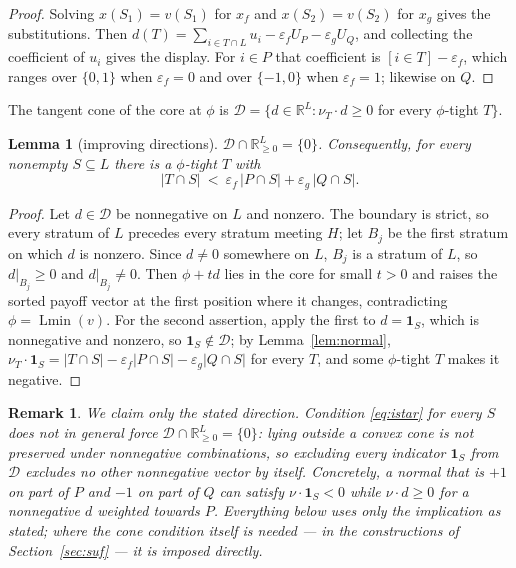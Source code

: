\documentclass[11pt]{article}
\newtheorem{lemma}[theorem]{Lemma}
\newtheorem{remark}[theorem]{Remark}
\newcommand{\Lmin}{\operatorname{Lmin}}
\newcommand{\one}{\mathbf 1}
\begin{document}
\begin{proof}
Solving $x(S_1)=v(S_1)$ for $x_f$ and $x(S_2)=v(S_2)$ for $x_g$ gives the
substitutions.  Then
$d(T)=\sum_{i\in T\cap L}u_i-\varepsilon_fU_P-\varepsilon_gU_Q$, and
collecting the coefficient of $u_i$ gives the display.  For $i\in P$ that
coefficient is $[i\in T]-\varepsilon_f$, which ranges over $\{0,1\}$ when
$\varepsilon_f=0$ and over $\{-1,0\}$ when $\varepsilon_f=1$; likewise on $Q$.
\end{proof}

The tangent cone of the core at $\phi$ is
$\mathcal D=\{d\in\mathbb R^L:\nu_T\cdot d\ge0$ for every $\phi$-tight $T\}$.

\begin{lemma}[improving directions]\label{lem:improve}
$\mathcal D\cap\mathbb R^L_{\ge0}=\{0\}$.  Consequently, for every nonempty
$S\subseteq L$ there is a $\phi$-tight $T$ with
\begin{equation}\label{eq:istar}
 |T\cap S|\ <\ \varepsilon_f\,|P\cap S|+\varepsilon_g\,|Q\cap S| .
\end{equation}
\end{lemma}

\begin{proof}
Let $d\in\mathcal D$ be nonnegative on $L$ and nonzero.  The boundary is
strict, so every stratum of $L$ precedes every stratum meeting $H$; let $B_j$
be the first stratum on which $d$ is nonzero.  Since $d\ne0$ somewhere on $L$,
$B_j$ is a stratum of $L$, so $d|_{B_j}\ge0$ and $d|_{B_j}\ne0$.  Then
$\phi+td$ lies in the core for small $t>0$ and raises the sorted payoff vector
at the first position where it changes, contradicting $\phi=\Lmin(v)$.  For the
second assertion, apply the first to $d=\one_S$, which is nonnegative and
nonzero, so $\one_S\notin\mathcal D$; by Lemma~\ref{lem:normal},
$\nu_T\cdot\one_S=|T\cap S|-\varepsilon_f|P\cap S|-\varepsilon_g|Q\cap S|$ for
every $T$, and some $\phi$-tight $T$ makes it negative.
\end{proof}

\begin{remark}\label{rem:noconverse}
We claim only the stated direction.  Condition \eqref{eq:istar} for every $S$
does \emph{not} in general force $\mathcal D\cap\mathbb R^L_{\ge0}=\{0\}$:
lying outside a convex cone is not preserved under nonnegative combinations, so
excluding every indicator $\one_S$ from $\mathcal D$ excludes no other
nonnegative vector by itself.  Concretely, a normal that is $+1$ on part of $P$
and $-1$ on part of $Q$ can satisfy $\nu\cdot\one_S<0$ while $\nu\cdot d\ge0$
for a nonnegative $d$ weighted towards $P$.  Everything below uses only the
implication as stated; where the cone condition itself is needed --- in the
constructions of Section~\ref{sec:suf} --- it is imposed directly.
\end{remark}
\end{document}
